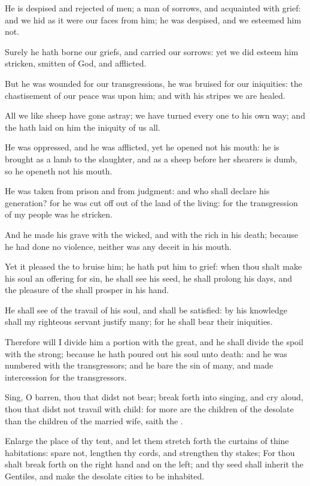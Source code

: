 \Verse He is despised and rejected of men; a man of sorrows, and acquainted with grief: and we hid as it were our faces from him; he was despised, and we esteemed him not.

\Verse Surely he hath borne our griefs, and carried our sorrows: yet we did esteem him stricken, smitten of God, and afflicted.

\Verse But he was wounded for our transgressions, he was bruised for our iniquities: the chastisement of our peace was upon him; and with his stripes we are healed.

\Verse All we like sheep have gone astray; we have turned every one to his own way; and the \LORD hath laid on him the iniquity of us all.

\Verse He was oppressed, and he was afflicted, yet he opened not his mouth: he is brought as a lamb to the slaughter, and as a sheep before her shearers is dumb, so he openeth not his mouth.

\Verse He was taken from prison and from judgment: and who shall declare his generation? for he was cut off out of the land of the living: for the transgression of my people was he stricken.

\Verse And he made his grave with the wicked, and with the rich in his death; because he had done no violence, neither was any deceit in his mouth.

\Verse Yet it pleased the \LORD to bruise him; he hath put him to grief: when thou shalt make his soul an offering for sin, he shall see his seed, he shall prolong his days, and the pleasure of the \LORD shall prosper in his hand.

\Verse He shall see of the travail of his soul, and shall be satisfied: by his knowledge shall my righteous servant justify many; for he shall bear their iniquities.

\Verse Therefore will I divide him a portion with the great, and he shall divide the spoil with the strong; because he hath poured out his soul unto death: and he was numbered with the transgressors; and he bare the sin of many, and made intercession for the transgressors.


\Chapter
\Verse Sing, O barren, thou that didst not bear; break forth into singing, and cry aloud, thou that didst not travail with child: for more are the children of the desolate than the children of the married wife, saith the \LORD.

\Verse Enlarge the place of thy tent, and let them stretch forth the curtains of thine habitations: spare not, lengthen thy cords, and strengthen thy stakes; \Verse For thou shalt break forth on the right hand and on the left; and thy seed shall inherit the Gentiles, and make the desolate cities to be inhabited.

